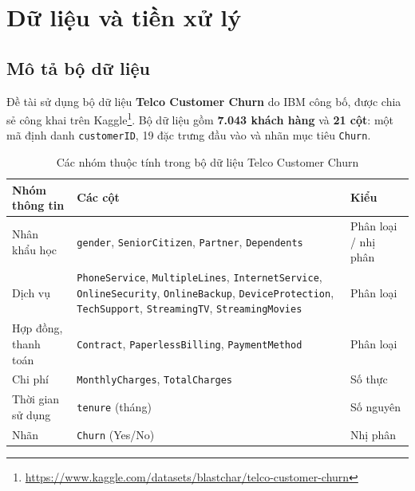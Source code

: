 \section{Dữ liệu và tiền xử lý}

\subsection{Mô tả bộ dữ liệu}
Đề tài sử dụng bộ dữ liệu \textbf{Telco Customer Churn} do IBM công bố, được chia sẻ công khai trên Kaggle\footnote{\url{https://www.kaggle.com/datasets/blastchar/telco-customer-churn}}. Bộ dữ liệu gồm \textbf{7.043 khách hàng} và \textbf{21 cột}: một mã định danh \texttt{customerID}, 19 đặc trưng đầu vào và nhãn mục tiêu \texttt{Churn}.

\begin{table}[H]
\centering
\begin{tabular}{p{4cm} p{8.5cm} l}
\toprule
\textbf{Nhóm thông tin} & \textbf{Các cột} & \textbf{Kiểu} \\
\midrule
Nhân khẩu học & \texttt{gender}, \texttt{SeniorCitizen}, \texttt{Partner}, \texttt{Dependents} & Phân loại / nhị phân \\
Dịch vụ & \texttt{PhoneService}, \texttt{MultipleLines}, \texttt{InternetService}, \texttt{OnlineSecurity}, \texttt{OnlineBackup}, \texttt{DeviceProtection}, \texttt{TechSupport}, \texttt{StreamingTV}, \texttt{StreamingMovies} & Phân loại \\
Hợp đồng, thanh toán & \texttt{Contract}, \texttt{PaperlessBilling}, \texttt{PaymentMethod} & Phân loại \\
Chi phí & \texttt{MonthlyCharges}, \texttt{TotalCharges} & Số thực \\
Thời gian sử dụng & \texttt{tenure} (tháng) & Số nguyên \\
Nhãn & \texttt{Churn} (Yes/No) & Nhị phân \\
\bottomrule
\end{tabular}
\caption{Các nhóm thuộc tính trong bộ dữ liệu Telco Customer Churn}
\end{table}

